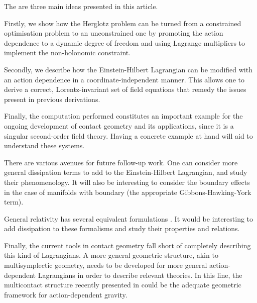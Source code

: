 \documentclass[../main.tex]{subfiles}
\begin{document}
The are three main ideas presented in this article.

Firstly, we show how the Herglotz problem can be turned from a constrained optimisation problem to an unconstrained one by promoting the action dependence to a dynamic degree of freedom and using Lagrange multipliers to implement the non-holonomic constraint.

Secondly, we describe how the Einstein-Hilbert Lagrangian can be modified with an action dependence in a coordinate-independent manner. This allows one to derive a correct, Lorentz-invariant set of field equations that remedy the issues present in previous derivations. 

Finally, the computation performed constitutes an important example for the ongoing development of contact geometry and its applications, since it is a singular second-order field theory. Having a concrete example at hand will aid to understand these systems.

There are various avenues for future follow-up work. One can consider more general dissipation terms to add to the Einstein-Hilbert Lagrangian, and study their phenomenology. It will also be interesting to consider the boundary effects in the case of manifolds with boundary (the appropriate Gibbons-Hawking-York term). 

General relativity has several equivalent formulations \cite{gaset2019,Vey_2015}. It would be interesting to add dissipation to these formalisms and study their properties and relations.

Finally, the current tools in contact geometry fall short of completely describing this kind of Lagrangians. A more general geometric structure, akin to multisymplectic geometry, needs to be developed for more general action-dependent Lagrangians in order to describe relevant theories. In this line, the multicontact structure recently presented in \cite{de_leon_multicontact_2022} could be the adequate geometric framework for action-dependent gravity.
\end{document}
